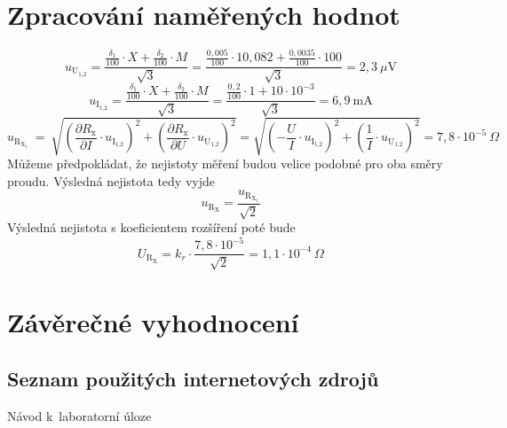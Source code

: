 \documentclass[a4paper,12pt]{article}   %
\renewcommand{\t}[1]{\text{#1}}
\begin{document}
\section{Zpracování naměřených hodnot}
\label{chap:zpracovani_hodnot}
\begin{equation}
  u_\text{U$_\text{1,2}$}=\frac{\frac{\delta_1}{100}\cdot X+\frac{\delta_2}{100}\cdot M}{\sqrt{3}} = \frac{\frac{0,005}{100}\cdot 10,082+\frac{0,0035}{100}\cdot 100}{\sqrt{3}} = 2,3~\mu\text{V}
\end{equation}
\begin{equation}
  u_\text{I$_\text{1,2}$}=\frac{\frac{\delta_1}{100}\cdot X+\frac{\delta_2}{100}\cdot M}{\sqrt{3}} = \frac{\frac{0,2}{100}\cdot 1 + 10\cdot 10^{-3}}{\sqrt{3}} = 6,9~\text{mA}
\end{equation}
\begin{equation}
  u_{\text{R}_{\text{X}_\text{1}}}~=~\sqrt{\left(\frac{\partial R_\t{x}}{\partial I}\cdot u_{\t{I}_{\t{1,2}}}\right)^2 + \left(\frac{\partial R_\t{x}}{\partial U}\cdot u_{\t{U}_{\t{1,2}}}\right)^2} = \sqrt{\left(-\frac{U}{I} \cdot u_{\t{I}_{\t{1,2}}} \right)^2 + \left(\frac{1}{I} \cdot u_{\t{U}_{\t{1,2}}} \right)^2} = 7,8\cdot 10^{-5}~\Omega
\end{equation}
Můžeme předpokládat, že nejistoty měření budou velice podobné pro oba směry proudu. Výsledná nejistota tedy vyjde
\begin{equation}
  u_{\t{R}_\t{X}}=\frac{u_{\text{R}_{\text{X}_\text{1}}}}{\sqrt{2}}
\end{equation}
Výsledná nejistota s koeficientem rozšíření poté bude
\begin{equation}
  U_{\t{R}_\t{X}}=k_r\cdot \frac{7,8\cdot 10^{-5}}{\sqrt{2}} = 1,1\cdot 10^{-4}~\Omega
\end{equation}



\section{Závěrečné vyhodnocení}
\label{chap:zaver}



\clearpage
\renewcommand{\refname}{Seznam použité literatury a~zdrojů informací} 

\begin{thebibliography}{99}

\subsection*{Seznam použitých internetových zdrojů}
     Návod k~laboratorní úloze
    
\end{thebibliography}
\end{document}
